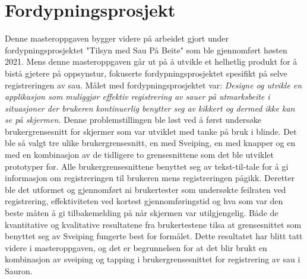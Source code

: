 \section{Fordypningsprosjekt}
Denne masteroppgaven bygger videre på arbeidet gjort under fordypningsprosjektet "Tilsyn med Sau På Beite" \cite{Abtahi2020TilsynBeite} som ble gjennomført høsten 2021. Mens denne masteroppgaven går ut på å utvikle et helhetlig produkt for å bistå gjetere på oppsynstur, fokuserte fordypningsprosjektet spesifikt på selve registreringen av sau. Målet med fordypningsprosjektet var: 
\newline
\newline
\textit{Designe og utvikle en applikasjon som muliggjør effektiv registrering av sauer på utmarksbeite i situasjoner der brukeren kontinuerlig benytter seg av kikkert og dermed ikke kan se på skjermen.} \cite[~s. 3]{Abtahi2020TilsynBeite}
\newline
\newline
Denne problemstillingen ble løst ved å først undersøke brukergrensesnitt for skjermer som var utviklet med tanke på bruk i blinde. Det ble så valgt tre ulike brukergrensesnitt, en med Sveiping, en med knapper og en med en kombinasjon av de tidligere to grensesnittene som det ble utviklet prototyper for. Alle brukergrensesnittene benyttet seg av tekst-til-tale for å gi informasjon om registreringen til brukeren mens registreringen pågikk. Deretter ble det utformet og gjennomført ni brukertester som undersøkte feilraten ved registrering, effektiviteten ved kortest gjennomføringstid og hva som var den beste måten å gi tilbakemelding på når skjermen var utilgjengelig. Både de kvantitative og kvalitative resultatene fra brukertestene tilsa at grensesnittet som benyttet seg av Sveiping fungerte best for formålet. Dette resultatet har blitt tatt videre i masteroppgaven, og det er begrunnelsen for at det blir brukt en kombinasjon av sveiping og tapping i brukergrensesnittet for registrering av sau i Sauron.

